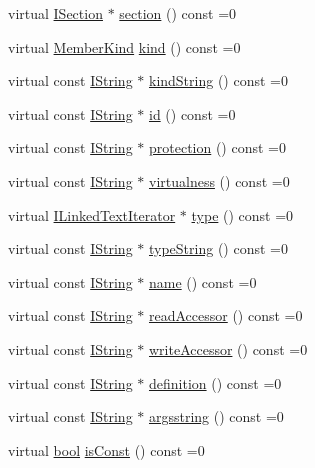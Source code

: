 \begin{DoxyCompactItemize}
\item 
virtual \hyperlink{class_i_section}{I\+Section} $\ast$ \hyperlink{class_i_member_a17fa83e7c5446b1ef014a067aeff1681}{section} () const  =0
\item 
virtual \hyperlink{class_i_member_ab486b4d2fdebc7a181e8dd0a09170956}{Member\+Kind} \hyperlink{class_i_member_a954ba2eeed75a5d451f38be19b0f3873}{kind} () const  =0
\item 
virtual const \hyperlink{class_i_string}{I\+String} $\ast$ \hyperlink{class_i_member_a329e8a567d1dc868a496d2502976d843}{kind\+String} () const  =0
\item 
virtual const \hyperlink{class_i_string}{I\+String} $\ast$ \hyperlink{class_i_member_a4f2a1cfb4d4238cef520640daeeb53d7}{id} () const  =0
\item 
virtual const \hyperlink{class_i_string}{I\+String} $\ast$ \hyperlink{class_i_member_abbbeb52ce625f60086ce4ef7082f161f}{protection} () const  =0
\item 
virtual const \hyperlink{class_i_string}{I\+String} $\ast$ \hyperlink{class_i_member_a9f160f10f6951109a51d2c1b4e3a0bb8}{virtualness} () const  =0
\item 
virtual \hyperlink{class_i_linked_text_iterator}{I\+Linked\+Text\+Iterator} $\ast$ \hyperlink{class_i_member_a0d5ed8e2bdcc4e88e3a219ace6b6eaab}{type} () const  =0
\item 
virtual const \hyperlink{class_i_string}{I\+String} $\ast$ \hyperlink{class_i_member_ae73d51cf63fb81e8bd965826637f19b1}{type\+String} () const  =0
\item 
virtual const \hyperlink{class_i_string}{I\+String} $\ast$ \hyperlink{class_i_member_a4f1838f08a055c95e12ce9d7728838ae}{name} () const  =0
\item 
virtual const \hyperlink{class_i_string}{I\+String} $\ast$ \hyperlink{class_i_member_a813586861b788da2fd927c9fbf72c07c}{read\+Accessor} () const  =0
\item 
virtual const \hyperlink{class_i_string}{I\+String} $\ast$ \hyperlink{class_i_member_ab031553ce7d249973df1978813297de9}{write\+Accessor} () const  =0
\item 
virtual const \hyperlink{class_i_string}{I\+String} $\ast$ \hyperlink{class_i_member_a17bf37f15c7b71c1654a9434d1a04c14}{definition} () const  =0
\item 
virtual const \hyperlink{class_i_string}{I\+String} $\ast$ \hyperlink{class_i_member_a370b7eecee959eacb90f91c6ef153f82}{argsstring} () const  =0
\item 
virtual \hyperlink{qglobal_8h_a1062901a7428fdd9c7f180f5e01ea056}{bool} \hyperlink{class_i_member_a6bb0217d28c3c4b1629af1f1701801fc}{is\+Const} () const  =0

\end{DoxyCompactItemize}
